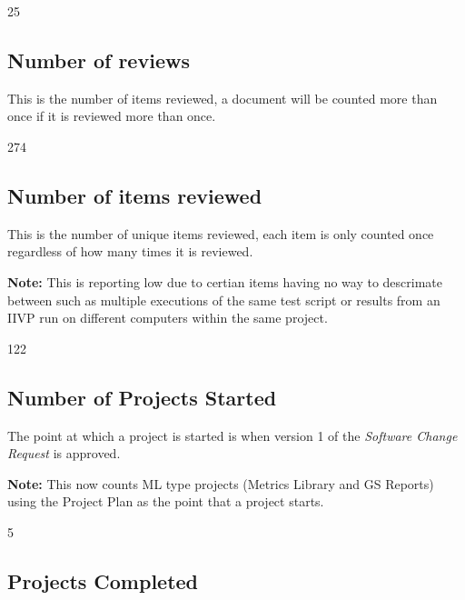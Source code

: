 \documentclass{article}
\begin{document}
\begin{Schunk}
\begin{Soutput}
[1] 25
\end{Soutput}
\end{Schunk}

\subsection{Number of reviews}
This is the number of items reviewed, a document will be counted more than once
if it is reviewed more than once.

\begin{Schunk}
\begin{Soutput}
[1] 274
\end{Soutput}
\end{Schunk}

\subsection{Number of items reviewed}
This is the number of unique items reviewed, each item is only counted once
regardless of how many times it is reviewed.

\textbf{Note:} This is reporting low due to certian items having no way to
descrimate between such as multiple executions of the same test script or
results from an IIVP run on different computers within the same project.

\begin{Schunk}
\begin{Soutput}
[1] 122
\end{Soutput}
\end{Schunk}

\subsection{Number of Projects Started}
The point at which a project is started is when version 1 of the \textit{Software
Change Request} is approved.

\textbf{Note:} This now counts ML type projects (Metrics Library and GS Reports)
using the Project Plan as the point that a project starts.

\begin{Schunk}
\begin{Soutput}
[1] 5
\end{Soutput}
\end{Schunk}

\subsection{Projects Completed}
\end{document}
